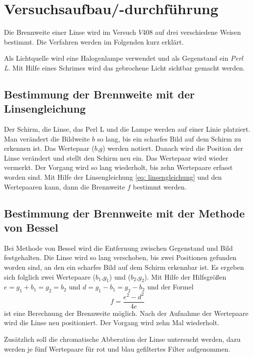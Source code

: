 \section{Versuchsaufbau/-durchführung}
Die Brennweite einer Linse wird im Versuch $V408$ auf drei
verschiedene Weisen bestimmt.
Die Verfahren werden im Folgenden kurz erklärt.

Als Lichtquelle wird eine Halogenlampe verwendet und als
Gegenstand ein \emph{Perl L}. Mit Hilfe eines Schrimes wird
das gebrochene Licht sichtbar gemacht werden.

\subsection{Bestimmung der Brennweite mit der Linsengleichung}

Der Schirm, die Linse, das Perl L und die Lampe werden auf einer
Linie platziert.
Man verändert die Bildweite $b$ so lang, bis ein scharfes Bild auf dem
Schirm zu erkennen ist. Das Wertepaar ($b$,$g$) werden notiert.
Danach wird die Position der Linse verändert und stellt den Schirm neu ein.
Das Wertepaar wird wieder vermerkt. Der Vorgang wird so lang wiederholt, bis
zehn Wertepaare erfasst worden sind.
Mit Hilfe der Linsengleichung \eqref{eq: linsengleichung} und den Wertepaaren kann, dann die
Brennweite $f$ bestimmt werden.

\subsection{Bestimmung der Brennweite mit der Methode von Bessel}
Bei Methode von Bessel wird die Entfernung zwischen
Gegenstand und Bild festgehalten. Die Linse wird so lang verschoben, bis zwei
Positionen gefunden worden sind, an den ein scharfes Bild auf dem Schirm erkennbar ist.
Es ergeben sich folglich zwei Wertepaare ($b_1$,$g_1$) und ($b_2$,$g_2$).
Mit Hilfe der Hilfsgrößen $e=g_1+b_1=g_2=b_2$ und $d=g_1-b_1=g_2-b_2$ und der Formel
\begin{equation}
  \label{eq: bessel_methode}
  f=\frac{e^2-d^2}{4e}
\end{equation}
ist eine Berechnung der Brennweite möglich.
Nach der Aufnahme der Wertepaare wird die Linse neu positioniert.
Der Vorgang wird zehn Mal wiederholt.

Zusätzlich soll die chromatische Abberation der Linse untersucht werden,
dazu werden je fünf Wertepaare für rot und blau gefiltertes Filter
aufgenommen.
